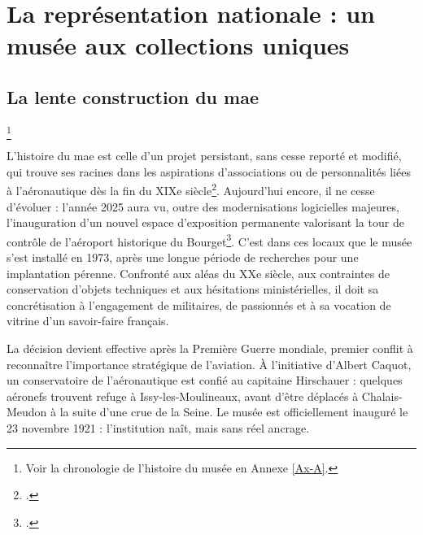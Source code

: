 %

\section{\label{I-A-1}La représentation nationale : un musée aux collections uniques}

\subsection{La lente construction du \ac{mae}}\footnote{Voir la chronologie de l'histoire du musée en Annexe \ref{Ax-A}.}

L’histoire du \acf{mae} est celle d’un projet persistant, sans cesse reporté et modifié, qui trouve ses racines dans les aspirations d'associations ou de personnalités liées à l'aéronautique dès la fin du XIXe siècle\footcite{terrierAeroportParisBourget2019}. Aujourd'hui encore, il ne cesse d'évoluer : l’année 2025 aura vu, outre des modernisations logicielles majeures, l'inauguration d’un nouvel espace d’exposition permanente valorisant la tour de contrôle de l’aéroport historique du Bourget\footcite{museedelairetdelespaceHallNavigationAerienne2025}. C’est dans ces locaux que le musée s’est installé en 1973, après une longue période de recherches pour une implantation pérenne. Confronté aux aléas du XXe siècle, aux contraintes de conservation d’objets techniques et aux hésitations ministérielles, il doit sa concrétisation à l’engagement de militaires, de passionnés et à sa vocation de vitrine d’un savoir-faire français.

La décision devient effective après la Première Guerre mondiale, premier conflit à reconnaître l’importance stratégique de l’aviation. À l’initiative d’Albert Caquot, un conservatoire de l’aéronautique est confié au capitaine Hirschauer : quelques aéronefs trouvent refuge à Issy-les-Moulineaux, avant d’être déplacés à Chalais-Meudon à la suite d’une crue de la Seine. Le musée est officiellement inauguré le 23 novembre 1921 : l’institution naît, mais sans réel ancrage.

